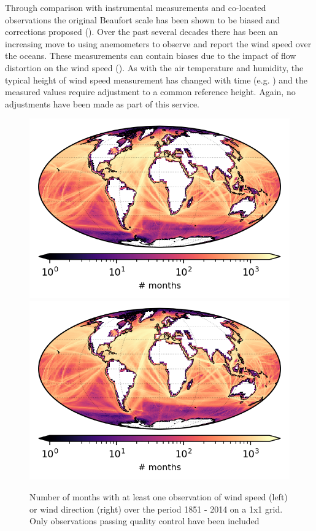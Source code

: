 Through comparison with instrumental measurements and co-located observations the original Beaufort scale has been shown to be biased and corrections proposed (\cite{Kent1997}).
Over the past several decades there has been an increasing move to using anemometers to observe and report the wind speed over the oceans. 
These measurements can contain biases due to the impact of flow distortion on the wind speed (\cite{Moat2005}).
As with the air temperature and humidity, the typical height of wind speed measurement has changed with time (e.g. \cite{Thomas2008}) and the measured values require adjustment to a common reference height.
Again, no adjustments have been made as part of this service.

\begin{figure}[h]
    \centering
    \includegraphics{resources/observations-ws-months-map-optimal.png}
    \includegraphics{resources/observations-wd-months-map-optimal.png}
    \caption{Number of months with at least one observation of wind speed (left) or wind direction (right) over the period 1851 - 2014 on a 1x1 grid. Only observations passing quality control have been included}
    \label{fig:wspd-nmonths-map}
\end{figure}

